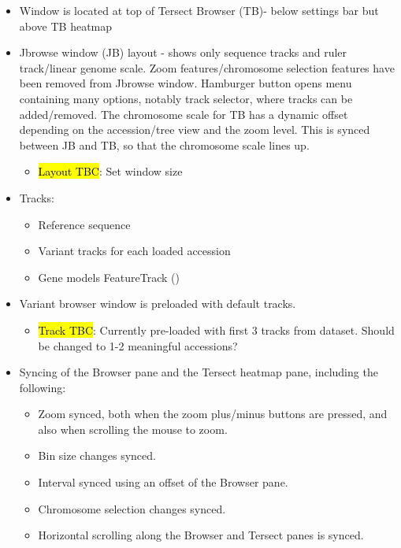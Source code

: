 \documentclass[12pt]{article}
\begin{document}
\begin{itemize}
    \item Window is located at top of Tersect Browser (TB)- below settings bar but above TB heatmap 
    \item Jbrowse window (JB) layout - shows only sequence tracks and ruler track/linear genome scale. Zoom features/chromosome selection features have been removed from Jbrowse window. Hamburger button opens menu containing many options, notably track selector, where tracks can be added/removed. The chromosome scale for TB has a dynamic offset depending on the accession/tree view and the zoom level. This is synced between JB and TB, so that the chromosome scale lines up. 
    \begin{itemize}
        \item \hl{Layout TBC}: Set window size
    \end{itemize}
    \item Tracks:
    \begin{itemize}
        \item Reference sequence 
        \item Variant tracks for each loaded accession
        \item Gene models FeatureTrack ()
    \end{itemize}
    \item Variant browser window is preloaded with default tracks. 
    \begin{itemize}
        \item \hl{Track TBC}: Currently pre-loaded with first 3 tracks from dataset. Should be changed to 1-2 meaningful accessions?
    \end{itemize}
    \item Syncing of the Browser pane and the Tersect heatmap pane, including the following:
    \begin{itemize}
        \item Zoom synced, both when the zoom plus/minus buttons are pressed, and also when scrolling the mouse to zoom. 
        \item Bin size changes synced.
        \item Interval synced using an offset of the Browser pane.
        \item Chromosome selection changes synced.
        \item Horizontal scrolling along the Browser and Tersect panes is synced.
    \end{itemize}
\end{itemize}
    
\end{document}
